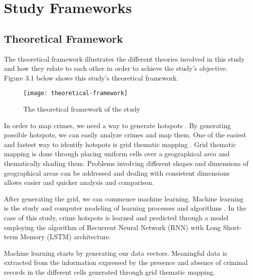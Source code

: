 
\chapter{Study Frameworks}  %
\section{Theoretical Framework}

The theoretical framework illustrates the different theories involved in this study and how they relate to each other in order to achieve the study's objective. Figure 3.1 below shows this study's theoretical framework.
\begin{figure}[H]
    \centering
    \texttt{[image: theoretical-framework]}
    \caption{The theoretical framework of the study}
\end{figure}
In order to map crimes, we need a way to generate hotspots \citep{eck2005mapping}. By generating possible hotspots, we can easily analyze crimes and map them. One of the easiest and fastest way to identify hotspots is grid thematic mapping \citep{chainey2008utility}. Grid thematic mapping is done through placing uniform cells over a geographical area and thematically shading them. Problems involving different shapes and dimensions of geographical areas can be addressed and dealing with consistent dimensions allows easier and quicker analysis and comparison.

After generating the grid, we can commence machine learning. Machine learning is the study and computer modeling of learning processes and algorithms \citep{michalski2013machine}. In the case of this study, crime hotspots is learned and predicted through a model employing the algorithm of Recurrent Neural Network (RNN) with Long Short-term Memory (LSTM) architecture. 

Machine learning starts by generating our data vectors. Meaningful data is extracted from the information expressed by the presence and absence of criminal records in the different cells generated through grid thematic mapping.

